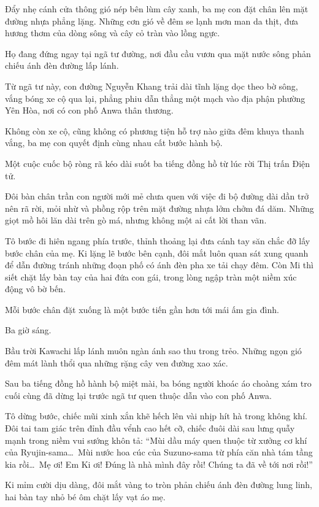 \documentclass[../main.tex]{subfiles}
\begin{document}
Đẩy nhẹ cánh cửa thông gió nép bên lùm cây xanh, ba mẹ con đặt chân lên mặt đường nhựa phẳng lặng. Những cơn gió về đêm se lạnh mơn man da thịt, đưa hương thơm của dòng sông và cây cỏ tràn vào lồng ngực.

Họ đang đứng ngay tại ngã tư đường, nơi đầu cầu vươn qua mặt nước sông phản chiếu ánh đèn đường lấp lánh.

Từ ngã tư này, con đường Nguyễn Khang trải dài tĩnh lặng dọc theo bờ sông, vắng bóng xe cộ qua lại, phẳng phiu dẫn thẳng một mạch vào địa phận phường Yên Hòa, nơi có con phố Anwa thân thương.

Không còn xe cộ, cũng không có phương tiện hỗ trợ nào giữa đêm khuya thanh vắng, ba mẹ con quyết định cùng nhau cất bước hành bộ.

Một cuộc cuốc bộ ròng rã kéo dài suốt ba tiếng đồng hồ từ lúc rời Thị trấn Điện tử.

Đôi bàn chân trần con người mới mẻ chưa quen với việc đi bộ đường dài dần trở nên rã rời, mỏi nhừ và phồng rộp trên mặt đường nhựa lởm chởm đá dăm. Những giọt mồ hôi lăn dài trên gò má, nhưng không một ai cất lời than vãn.

Tô bước đi hiên ngang phía trước, thỉnh thoảng lại đưa cánh tay săn chắc đỡ lấy bước chân của mẹ. Ki lặng lẽ bước bên cạnh, đôi mắt luôn quan sát xung quanh để dẫn đường tránh những đoạn phố có ánh đèn pha xe tải chạy đêm. Còn Mi thì siết chặt lấy bàn tay của hai đứa con gái, trong lòng ngập tràn một niềm xúc động vô bờ bến.

Mỗi bước chân đặt xuống là một bước tiến gần hơn tới mái ấm gia đình.

\ct

Ba giờ sáng.

Bầu trời Kawachi lấp lánh muôn ngàn ánh sao thu trong trẻo. Những ngọn gió đêm mát lành thổi qua những rặng cây ven đường xao xác.

Sau ba tiếng đồng hồ hành bộ miệt mài, ba bóng người khoác áo choàng xám tro cuối cùng đã dừng lại trước ngã tư quen thuộc dẫn vào con phố Anwa.

Tô dừng bước, chiếc mũi xinh xắn khẽ hếch lên vài nhịp hít hà trong không khí. Đôi tai tam giác trên đỉnh đầu vểnh cao hết cỡ, chiếc đuôi dài sau lưng quẫy mạnh trong niềm vui sướng khôn tả: ``Mùi dầu máy quen thuộc từ xưởng cơ khí của Ryujin-sama\dots\ Mùi nước hoa cúc của Suzuno-sama từ phía căn nhà tám tầng kia rồi\dots\ Mẹ ơi! Em Ki ơi! Đúng là nhà mình đây rồi! Chúng ta đã về tới nơi rồi!''

Ki mỉm cười dịu dàng, đôi mắt vàng to tròn phản chiếu ánh đèn đường lung linh, hai bàn tay nhỏ bé ôm chặt lấy vạt áo mẹ.
\end{document}
